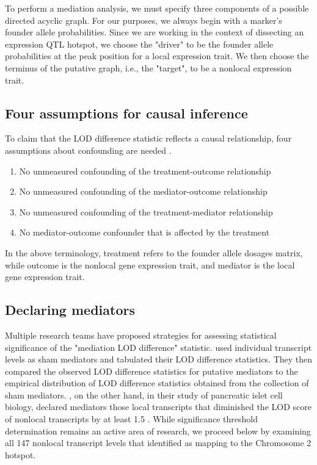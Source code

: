 \documentclass{article}
\begin{document}
To perform a mediation analysis, we must specify three components of a possible directed acyclic graph. For our purposes, we always begin with a marker's founder allele probabilities. Since we are working in the context of dissecting an expression QTL hotspot, we choose the "driver" to be the founder allele probabilities at the peak position for a local expression trait. We then choose the terminus of the putative graph, i.e., the "target", to be a nonlocal expression trait. 






\subsection{Four assumptions for causal inference}

To claim that the LOD difference statistic reflects a causal relationship, four assumptions about confounding are needed \citep{vanderweele2015explanation}. 


\begin{mdframed}
\begin{enumerate}
\item No unmeasured confounding of the treatment-outcome relationship
\item No unmeasured confounding of the mediator-outcome relationship
\item No unmeasured confounding of the treatment-mediator relationship
\item No mediator-outcome confounder that is affected by the treatment
\label{list4}
\end{enumerate}
\end{mdframed}


In the above terminology, treatment refers to the founder allele dosages matrix, while outcome is the nonlocal gene expression trait, and mediator is the local gene expression trait.





\subsection{Declaring mediators}

Multiple research teams have proposed strategies for assessing statistical significance of the "mediation LOD difference" statistic. \citet{chick2016defining} used individual transcript levels as sham mediators and tabulated their LOD difference statistics. They then compared the observed LOD difference statistics for putative mediators to the empirical distribution of LOD difference statistics obtained from the collection of sham mediators. \citet{keller2018genetic}, on the other hand, in their study of pancreatic islet cell biology, declared mediators those local transcripts that diminished the LOD score of nonlocal transcripts by at least 1.5 \citep{keller2018genetic}. While significance threshold determination remains an active area of research, we proceed below by examining all 147 nonlocal transcript levels that \citet{keller2018genetic} identified as mapping to the Chromosome 2 hotspot.
 
\end{document}
